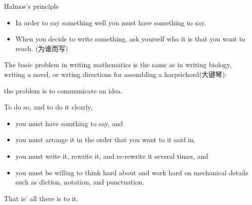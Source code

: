 \documentclass[13pt]{ctexbeamer}
\begin{document}
\begin{frame}{Halmos's principle}
	\begin{itemize}
		\item  In order to say something well you must have something to say. 
		\item When you decide to write something, ask yourself who it is that you want to reach. (为谁而写)
	\end{itemize}

\vspace{8pt}
The basic problem in writing mathematics is the same as in writing biology, writing a novel, or wrting directions for assembling a harpsichord(大键琴): 
\begin{center}
the problem is \alert{to communicate an idea}.
\end{center}
To do so, and to do it clearly, 
\begin{itemize}
	\item you must have somthing to say, and 
	\item you must arrange it in the order that you want to it said in, 
	\item you must write it, rewrite it, and re-rewrite it  several times, and 
	\item you must be willing to think hard about and work hard on mechanical details such as diction, notation, and punctuation.
	\end{itemize}
That is' all there is to it.
\end{frame}
	
	
\end{document}
